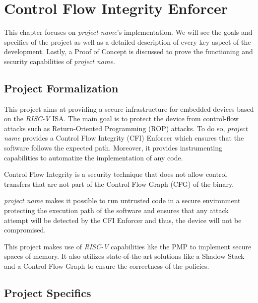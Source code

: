 \chapter{Control Flow Integrity Enforcer}
\label{cha:project}

This chapter focuses on \textit{project name}'s implementation. We will see the
goals and specifics of the project as well as a detailed description of every
key aspect of the development. Lastly, a Proof of Concept is discussed to prove
the functioning and security capabilities of \textit{project name}.

\section{Project Formalization}
\label{sec:project_formalization}

This project aims at providing a secure infrastructure for embedded devices
based on the \textit{RISC-V} ISA. The main goal is to protect the device from
control-flow attacks such as Return-Oriented Programming (ROP) attacks. To do so,
\textit{project name} provides a Control Flow Integrity (CFI) Enforcer which ensures
that the software follows the expected path. Moreover, it provides instrumenting
capabilities to automatize the implementation of any code.

Control Flow Integrity is a security technique that does not allow control transfers
that are not part of the Control Flow Graph (CFG) of the binary.

\textit{project name} makes it possible to run untrusted code in a secure
environment protecting the execution path of the software and ensures that any
attack attempt will be detected by the CFI Enforcer and thus, the device will not
be compromised.

This project makes use of \textit{RISC-V} capabilities like the PMP to implement
secure spaces of memory. It also utilizes state-of-the-art solutions like a Shadow
Stack and a Control Flow Graph to ensure the correctness of the policies.

\section{Project Specifics}
\label{sec:project_specifics}

